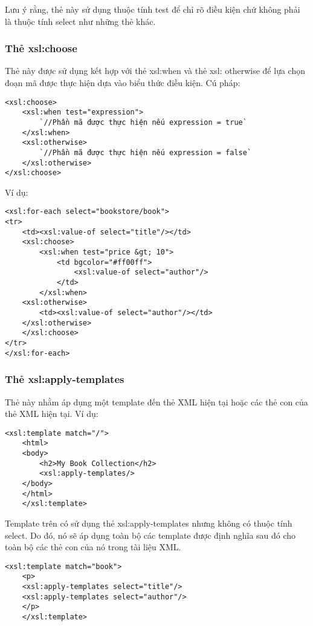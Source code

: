 Lưu ý rằng, thẻ này sử dụng thuộc tính {\ttfamily test} để chỉ rõ điều kiện chứ không phải là thuộc tính {\ttfamily select} như những thẻ khác.
\subsubsection {Thẻ xsl:choose}
Thẻ này được sử dụng kết hợp với thẻ {\ttfamily xsl:when} và thẻ {\ttfamily xsl: otherwise} để lựa chọn đoạn mã được thực hiện dựa vào biểu thức điều kiện. Cú pháp:
\lstset{language=XML}
\begin{lstlisting}[escapechar=`]
<xsl:choose>
	<xsl:when test="expression">
		`//Phần mã được thực hiện nếu expression = true`
	</xsl:when>
	<xsl:otherwise>
		`//Phần mã được thực hiện nếu expression = false`  
	</xsl:otherwise>
</xsl:choose>
\end{lstlisting}

Ví dụ:
\lstset{language=XML}
\begin{lstlisting}[escapechar=`]
<xsl:for-each select="bookstore/book">
<tr>
	<td><xsl:value-of select="title"/></td>
	<xsl:choose>
		<xsl:when test="price &gt; 10">
			<td bgcolor="#ff00ff">
				<xsl:value-of select="author"/>
			</td>
		</xsl:when>
	<xsl:otherwise>
		<td><xsl:value-of select="author"/></td>
	</xsl:otherwise>
	</xsl:choose>
</tr>
</xsl:for-each>
\end{lstlisting}

\subsubsection {Thẻ xsl:apply-templates}
Thẻ này nhằm áp dụng một template đến thẻ XML hiện tại hoặc các thẻ con của thẻ XML hiện tại. Ví dụ:
\lstset{language=XML}
\begin{lstlisting}[escapechar=`]
	<xsl:template match="/">
	<html>
	<body>
		<h2>My Book Collection</h2>
		<xsl:apply-templates/>
	</body>
	</html>
	</xsl:template>
\end{lstlisting}

Template trên có sử dụng thẻ {\ttfamily xsl:apply-templates} nhưng không có thuộc tính {\ttfamily select}. Do đó, nó sẽ áp dụng toàn bộ các template được định nghĩa sau đó cho toàn bộ các thẻ con của nó trong tài liệu XML.
\lstset{language=XML}
\begin{lstlisting}[escapechar=`]
	<xsl:template match="book">
	<p>
	<xsl:apply-templates select="title"/>
	<xsl:apply-templates select="author"/>
	</p>
	</xsl:template>
\end{lstlisting}

